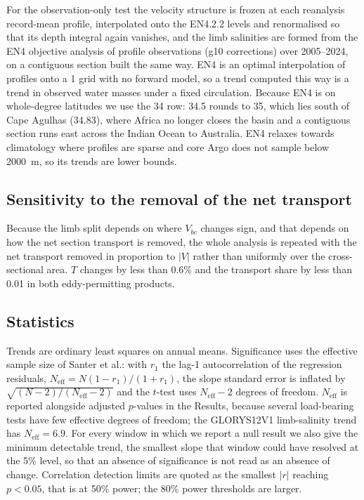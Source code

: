 For the observation-only test the velocity structure is frozen at each
reanalysis record-mean profile, interpolated onto the EN4.2.2 levels and
renormalised so that its depth integral again vanishes, and the limb salinities
are formed from the EN4 objective analysis of profile observations (g10
corrections) over 2005--2024, on a contiguous section built the same way. EN4 is
an optimal interpolation of profiles onto a 1\degree{} grid with no forward
model, so a trend computed this way is a trend in observed water masses under a
fixed circulation. Because EN4 is on whole-degree latitudes we use the
34\degS{} row: 34.5\degS{} rounds to 35\degS{}, which lies south of Cape
Agulhas (34.83\degS{}), where Africa no longer closes the basin and a
contiguous section runs east across the Indian Ocean to Australia. EN4 relaxes
towards climatology where profiles are sparse and core Argo does not sample
below 2000~m, so its trends are lower bounds.

\subsection*{Sensitivity to the removal of the net transport}

Because the limb split depends on where $V_{bc}$ changes sign, and that depends
on how the net section transport is removed, the whole analysis is repeated with
the net transport removed in proportion to $|V|$ rather than uniformly over the
cross-sectional area. $T$ changes by less than 0.6\% and the transport share by
less than 0.01 in both eddy-permitting products.

\subsection*{Statistics}

Trends are ordinary least squares on annual means. Significance uses the
effective sample size of Santer et al.\cite{Santer2000}: with $r_1$ the lag-1
autocorrelation of the regression residuals,
$N_{\text{eff}}=N(1-r_1)/(1+r_1)$, the slope standard error is inflated by
$\sqrt{(N-2)/(N_{\text{eff}}-2)}$ and the $t$-test uses $N_{\text{eff}}-2$
degrees of freedom. $N_{\text{eff}}$ is reported alongside adjusted
$p$-values in the Results, because several load-bearing tests have few
effective degrees of freedom; the GLORYS12V1 limb-salinity trend has
$N_{\text{eff}}=6.9$. For every window in which we report a null result we also
give the minimum detectable trend, the smallest slope that window could have
resolved at the 5\% level, so that an absence of significance is not read as an
absence of change. Correlation detection limits are quoted as the smallest $|r|$
reaching $p<0.05$, that is at 50\% power; the 80\% power thresholds are larger.

